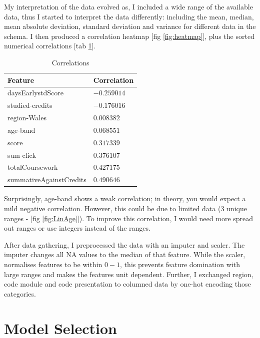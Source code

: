 \documentclass[11pt, a4paper]{article}
\begin{document}
\begin{multicols}{2}
My interpretation of the data evolved as, I included a wide range of the available data, thus I started to interpret the data differently: including the mean, median, mean absolute deviation, standard deviation and variance for different data in the schema.
I then produced a correlation heatmap [fig \ref{fig:heatmap}], plus the sorted numerical correlations [tab \ref{table:Correlations}].


\begin{table}[H]
	\centering
	\begin{tabular}{|l|l|}
		\hline
		\textbf{Feature}                    & \textbf{Correlation} \\ \hline
		daysEarlystdScore            & $-0.259014$ \\ \hline
		studied-credits             & $-0.176016$ \\ \hline
		region-Wales                & $0.008382$  \\ \hline
		age-band                    & $0.068551$  \\ \hline
		score                        & $0.317339$  \\ \hline
		sum-click                   & $0.376107$  \\ \hline
		totalCoursework              & $0.427175$  \\ \hline
		summativeAgainstCredits      & $0.490646$  \\ \hline
		\end{tabular}
		\caption{Correlations}
		\label{table:Correlations}
\end{table}


Surprisingly, age-band shows a weak correlation; in theory, you would expect a mild negative correlation. However, this could be due to limited data (3 unique ranges - [fig \ref{fig:LinAge}]). To improve this correlation, I would need more spread out ranges or use integers instead of the ranges.

After data gathering, I preprocessed the data with an imputer and scaler. The imputer changes all NA values to the median of that feature. 
While the scaler, normalises features to be within $0-1$, this prevents feature domination with large ranges and makes the features unit dependent.
Further, I exchanged region, code module and code presentation to columned data by one-hot encoding those categories.
\vspace{-0.4cm}
\section{Model Selection}


\end{multicols}
\end{document}
